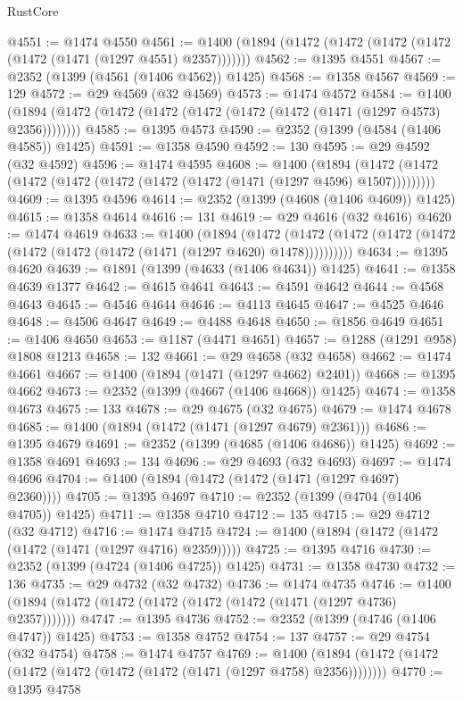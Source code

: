 \begin{lexlean}{RustCore}
\begin{coremodule}
@4551 := @1474 @4550
@4561 := @1400 (@1894 (@1472 (@1472 (@1472 (@1472 (@1472 (@1471 (@1297 @4551) @2357)))))))
@4562 := @1395 @4551
@4567 := @2352 (@1399 (@4561 (@1406 @4562)) @1425)
@4568 := @1358 @4567
@4569 := 129
@4572 := @29 @4569 (@32 @4569)
@4573 := @1474 @4572
@4584 := @1400 (@1894 (@1472 (@1472 (@1472 (@1472 (@1472 (@1472 (@1471 (@1297 @4573) @2356))))))))
@4585 := @1395 @4573
@4590 := @2352 (@1399 (@4584 (@1406 @4585)) @1425)
@4591 := @1358 @4590
@4592 := 130
@4595 := @29 @4592 (@32 @4592)
@4596 := @1474 @4595
@4608 := @1400
    (@1894 (@1472 (@1472 (@1472 (@1472 (@1472 (@1472 (@1472 (@1471 (@1297 @4596) @1507)))))))))
@4609 := @1395 @4596
@4614 := @2352 (@1399 (@4608 (@1406 @4609)) @1425)
@4615 := @1358 @4614
@4616 := 131
@4619 := @29 @4616 (@32 @4616)
@4620 := @1474 @4619
@4633 := @1400
    (@1894
      (@1472 (@1472 (@1472 (@1472 (@1472 (@1472 (@1472 (@1472 (@1471 (@1297 @4620) @1478))))))))))
@4634 := @1395 @4620
@4639 := @1891 (@1399 (@4633 (@1406 @4634)) @1425)
@4641 := @1358 @4639 @1377
@4642 := @4615 @4641
@4643 := @4591 @4642
@4644 := @4568 @4643
@4645 := @4546 @4644
@4646 := @4113 @4645
@4647 := @4525 @4646
@4648 := @4506 @4647
@4649 := @4488 @4648
@4650 := @1856 @4649
@4651 := @1406 @4650
@4653 := @1187 (@4471 @4651)
@4657 := @1288 (@1291 @958) @1808 @1213
@4658 := 132
@4661 := @29 @4658 (@32 @4658)
@4662 := @1474 @4661
@4667 := @1400 (@1894 (@1471 (@1297 @4662) @2401))
@4668 := @1395 @4662
@4673 := @2352 (@1399 (@4667 (@1406 @4668)) @1425)
@4674 := @1358 @4673
@4675 := 133
@4678 := @29 @4675 (@32 @4675)
@4679 := @1474 @4678
@4685 := @1400 (@1894 (@1472 (@1471 (@1297 @4679) @2361)))
@4686 := @1395 @4679
@4691 := @2352 (@1399 (@4685 (@1406 @4686)) @1425)
@4692 := @1358 @4691
@4693 := 134
@4696 := @29 @4693 (@32 @4693)
@4697 := @1474 @4696
@4704 := @1400 (@1894 (@1472 (@1472 (@1471 (@1297 @4697) @2360))))
@4705 := @1395 @4697
@4710 := @2352 (@1399 (@4704 (@1406 @4705)) @1425)
@4711 := @1358 @4710
@4712 := 135
@4715 := @29 @4712 (@32 @4712)
@4716 := @1474 @4715
@4724 := @1400 (@1894 (@1472 (@1472 (@1472 (@1471 (@1297 @4716) @2359)))))
@4725 := @1395 @4716
@4730 := @2352 (@1399 (@4724 (@1406 @4725)) @1425)
@4731 := @1358 @4730
@4732 := 136
@4735 := @29 @4732 (@32 @4732)
@4736 := @1474 @4735
@4746 := @1400 (@1894 (@1472 (@1472 (@1472 (@1472 (@1472 (@1471 (@1297 @4736) @2357)))))))
@4747 := @1395 @4736
@4752 := @2352 (@1399 (@4746 (@1406 @4747)) @1425)
@4753 := @1358 @4752
@4754 := 137
@4757 := @29 @4754 (@32 @4754)
@4758 := @1474 @4757
@4769 := @1400 (@1894 (@1472 (@1472 (@1472 (@1472 (@1472 (@1472 (@1471 (@1297 @4758) @2356))))))))
@4770 := @1395 @4758

\end{coremodule}
\end{lexlean}
